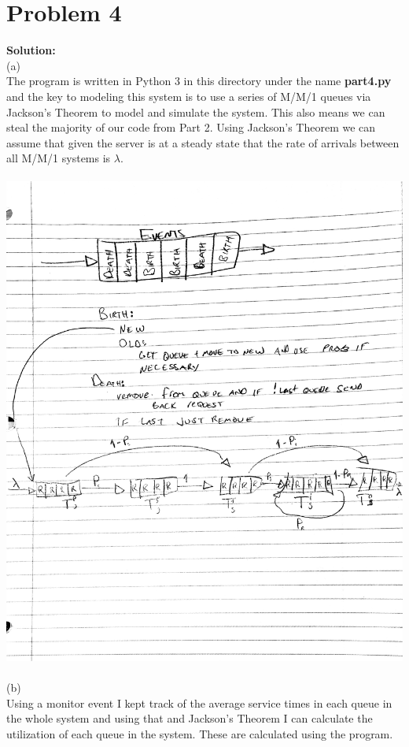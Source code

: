 \documentclass[letterpaper,11pt]{article}
\theoremstyle{mytheor}
\begin{document}
\section*{Problem 4}
\textbf{Solution:}\\
(a)\\
The program is written in Python 3 in this directory under the name \textbf{part4.py} and the key to modeling this system is to use a series of M/M/1 queues via Jackson's Theorem to model and simulate the system. This also means we can steal the majority of our code from Part 2. Using Jackson's Theorem we can assume that given the server is at a steady state that the rate of arrivals between all M/M/1 systems is $\lambda$.\\
\\
\includegraphics[scale=0.2]{Diagram.jpg}\\
\\
(b)\\
Using a monitor event I kept track of the average service times in each queue in the whole system and using that and Jackson's Theorem I can calculate the utilization of each queue in the system. These are calculated using the program.\\
\end{document}
